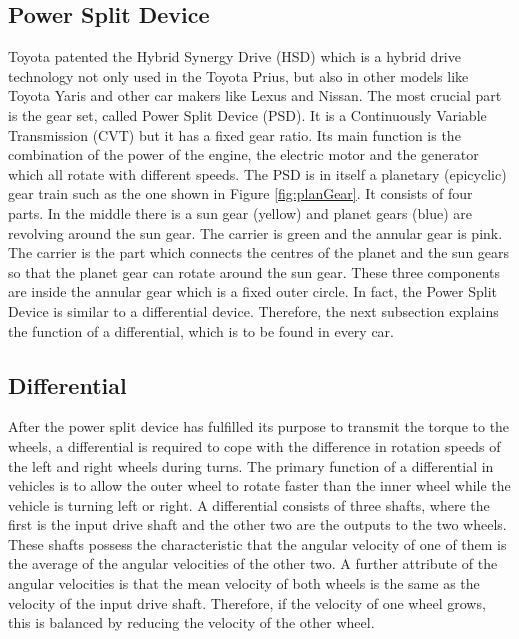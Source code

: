 \subsection{Power Split Device}
Toyota patented the Hybrid Synergy Drive (HSD) which is a hybrid drive technology not only used in the Toyota Prius, but also in other models like Toyota Yaris and other car makers like Lexus and Nissan. The most crucial part is the gear set, called Power Split Device (PSD). It is a Continuously Variable Transmission (CVT) but it has a fixed gear ratio. Its main function is the combination of the power of the engine, the electric motor and the generator which all rotate with different speeds. The PSD is in itself a planetary (epicyclic) gear train such as the one shown in Figure \ref{fig:planGear}. It consists of four parts. In the middle there is a sun gear (yellow) and planet gears (blue) are revolving around the sun gear. The carrier is green and the annular gear is pink. The carrier is the part which connects the centres of the planet and the sun gears so that the planet gear can rotate around the sun gear. These three components are inside the annular gear which is a fixed outer circle. In fact, the Power Split Device is similar to a differential device. Therefore, the next subsection explains the function of a differential, which is to be found in every car.

\subsection{Differential}
After the power split device has fulfilled its purpose to transmit the torque to the wheels, a differential is required to cope with the difference in rotation speeds of the left and right wheels during turns. The primary function of a differential in vehicles is to allow the outer wheel to rotate faster than the inner wheel while the vehicle is turning left or right. A differential consists of three shafts, where the first is the input drive shaft and the other two are the outputs to the two wheels. These shafts possess the characteristic that the angular velocity of one of them is the average of the angular velocities of the other two. A further attribute of the angular velocities is that the mean velocity of both wheels is the same as the velocity of the input drive shaft. Therefore, if the velocity of one wheel grows, this is balanced by reducing the velocity of the other wheel.

